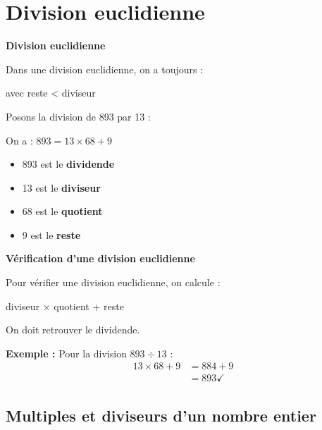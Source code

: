 \section{Division euclidienne}

\begin{definitionbox}
	\textbf{Division euclidienne}
	
	Dans une division euclidienne, on a toujours :
	\begin{center}
	\end{center}
	avec reste < diviseur
\end{definitionbox}

\begin{examplebox}
	Posons la division de 893 par 13 :
	
	\begin{center}		%
	\end{center}
	
	On a : $893 = 13 \times 68 + 9$
	\begin{itemize}[label = \textbullet]
		\item 893 est le \textbf{dividende}
		\item 13 est le \textbf{diviseur}
		\item 68 est le \textbf{quotient}
		\item 9 est le \textbf{reste}
	\end{itemize}
\end{examplebox}

\begin{methodebox}
	\textbf{Vérification d'une division euclidienne}
	
	Pour vérifier une division euclidienne, on calcule :
	\begin{center}
		diviseur × quotient + reste
	\end{center}
	On doit retrouver le dividende.
	
	\textbf{Exemple :} Pour la division $893 \div 13$ :
	\begin{align*}
		13 \times 68 + 9 &= 884 + 9\\
		&= 893 \checkmark
	\end{align*}
\end{methodebox}

\subsection{Multiples et diviseurs d'un nombre entier}

